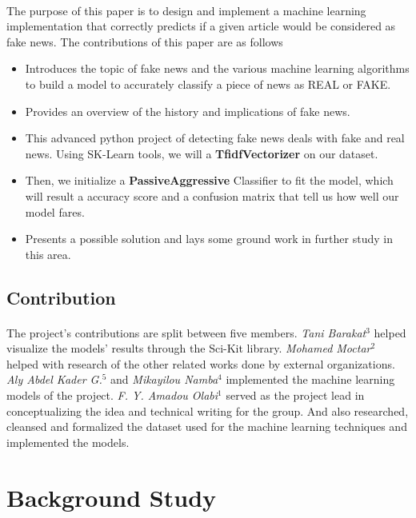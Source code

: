\documentclass[11.5pt]{article}
\begin{document}
\begin{multicols}{2}
\paragraph{}
The purpose of this paper is to design and implement a machine learning implementation that correctly predicts if a given article would be considered as fake news. The contributions of this paper are as follows
\begin{itemize}
    \item Introduces the topic of fake news and the various machine learning algorithms to build a model to accurately classify a piece of news as REAL or FAKE.
    \item Provides an overview of the history and implications of fake news.
    \item This advanced python project of detecting fake news deals with fake and real news. Using SK-Learn tools, we will a \textbf{TfidfVectorizer} on our dataset.
    \item Then, we initialize a \textbf{PassiveAggressive} Classifier to fit the model, which will result a accuracy score and a confusion matrix that tell us how well our model fares.
    \item Presents a possible solution and lays some ground work in further study in this area.
\end{itemize}

\subsection{Contribution}
\paragraph{}
The project’s contributions are split between five members. 
\textit{Tani Barakat}$^3$ helped visualize the models’ results through the Sci-Kit library. 
\textit{Mohamed Moctar}$^2$ helped with research of the other related works done by external organizations. 
\textit{Aly Abdel Kader G.}$^5$ and \textit{Mikayilou Namba}$^4$ implemented the machine learning models of the project.
\textit{F. Y. Amadou Olabi}$^1$ served as the project lead in conceptualizing the idea and technical writing for the group. And also researched, cleansed and formalized the dataset used for the machine learning techniques and implemented the models. 

\section{Background Study}

\end{multicols}
\end{document}
